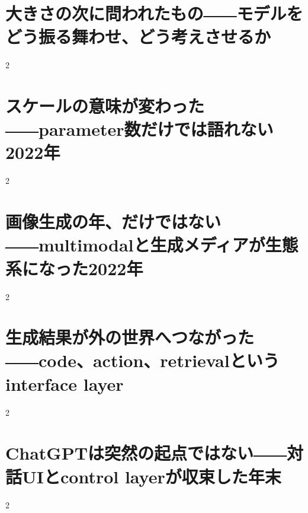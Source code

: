 \documentclass[lualatex,a4paper,11pt]{jlreq}
\begin{document}
\surveycover
\clearpage


\clearpage
\section{大きさの次に問われたもの――モデルをどう振る舞わせ、どう考えさせるか}
\label{pkg:steering-reasoning}

\medskip
\begin{multicols}{2}

\end{multicols}


\clearpage
\section{スケールの意味が変わった――parameter数だけでは語れない2022年}
\label{pkg:scale-access-systems}

\medskip
\begin{multicols}{2}

\end{multicols}


\clearpage
\section{画像生成の年、だけではない――multimodalと生成メディアが生態系になった2022年}
\label{pkg:multimodal-media}

\medskip
\begin{multicols}{2}

\end{multicols}


\clearpage
\section{生成結果が外の世界へつながった――code、action、retrievalというinterface layer}
\label{pkg:code-action-retrieval}

\medskip
\begin{multicols}{2}

\end{multicols}


\clearpage
\section{ChatGPTは突然の起点ではない――対話UIとcontrol layerが収束した年末}
\label{pkg:dialogue-interface-control}

\medskip
\begin{multicols}{2}

\end{multicols}

\end{document}
